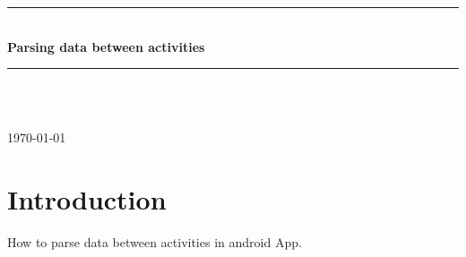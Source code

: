 \documentclass[12pt]{article} %
\begin{document}

\begin{titlepage}

\newcommand{\HRule}{\rule{\linewidth}{0.5mm}} %

\center %

\HRule \\[0.4cm]
{ \huge \bfseries Parsing data between activities}\\[0.4cm] %
\HRule \\[1.5cm]

\begin{minipage}{0.4\textwidth}
\end{minipage}\\[4cm]

{\large \today}\\[3cm] %


\vfill %

\end{titlepage}


\tableofcontents %

\newpage %


\section{Introduction} %

How to parse data between activities in android App.
\end{document}
